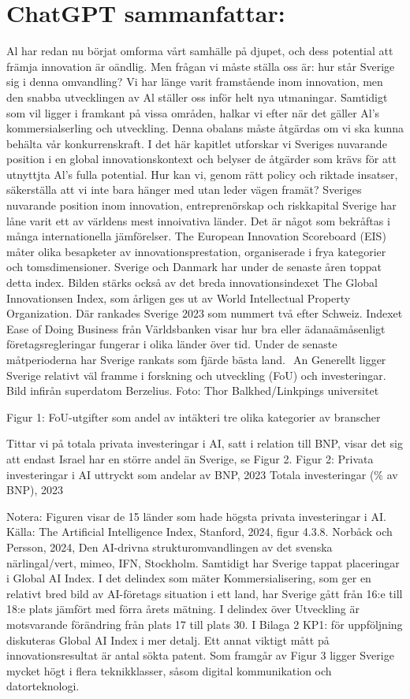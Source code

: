 {{{{{{{{{{{{\section*{ChatGPT sammanfattar:}
Al har redan nu börjat omforma vårt samhälle på djupet, och dess potential att främja innovation är oändlig. Men frågan vi måste ställa oss är: hur står Sverige sig i denna omvandling? Vi har länge varit framstående inom innovation, men den snabba utvecklingen av Al ställer oss inför helt nya utmaningar. Samtidigt som vil ligger i framkant på vissa områden, halkar vi efter när det gäller Al's kommersialserling och utveckling. Denna obalans måste åtgärdas om vi ska kunna behälta vår konkurrenskraft.
I det här kapitlet utforskar vi Sveriges nuvarande position i en global innovationskontext och belyser de åtgärder som krävs för att utnyttjta Al's fulla potential. Hur kan vi, genom rätt policy och riktade insatser, säkerställa att vi inte bara hänger med utan leder vägen framät?
Sveriges nuvarande position inom innovation, entreprenörskap och riskkapital
Sverige har låne varit ett av världens mest innoivativa länder. Det är något som bekråftas i många internationella jämförelser. The European Innovation Scoreboard (EIS) måter olika besapketer av innovationsprestation, organiserade i frya kategorier och tomsdimensioner. Sverige och Danmark har under de senaste åren toppat detta index. Bilden stärks också av det breda innovationsindexet The Global Innovationsen Index, som årligen ges ut av World Intellectual Property Organization. Där rankades Sverige 2023 som nummert två efter Schweiz. Indexet Ease of Doing
Business från Världsbanken visar hur bra eller ädanaämåsenligt företagsregleringar fungerar i olika länder över tid. Under de senaste måtperioderna har Sverige rankats som fjärde bästa land. \({ }^{}\) An
Generellt ligger Sverige relativt väl framme i forskning och utveckling (FoU) och investeringar. Bild infirån superdatom Berzelius. Foto: Thor Balkhed/Linkpings universitet

Figur 1: FoU-utgifter som andel av intäkteri tre olika kategorier av branscher

Tittar vi på totala privata investeringar i AI, satt i relation till BNP, visar det sig att endast Israel har en större andel än Sverige, se Figur 2.
Figur 2: Privata investeringar i AI uttryckt som andelar av BNP, 2023
Totala investeringar (\% av BNP), 2023

Notera: Figuren visar de 15 länder som hade högsta privata investeringar i AI.
Källa: The Artificial Intelligence Index, Stanford, 2024, figur 4.3.8. Norbåck och Persson, 2024, Den AI-drivna strukturomvandlingen av det svenska närlingal/vert, mimeo, IFN, Stockholm.
Samtidigt har Sverige tappat placeringar i Global AI Index. I det delindex som mäter Kommersialisering, som ger en relativt bred bild av AI-företags situation i ett land, har Sverige gått från 16:e till 18:e plats jämfört med förra årets mätning. I delindex över Utveckling är motsvarande förändring från plats 17 till plats 30. I Bilaga 2 KP1: för uppföljning diskuteras Global AI Index i mer detalj. Ett annat viktigt mått på innovationsresultat är antal sökta patent. Som framgår av Figur 3 ligger Sverige mycket högt i flera teknikklasser, såsom digital kommunikation och datorteknologi.

}}}}}}}}}}}}
